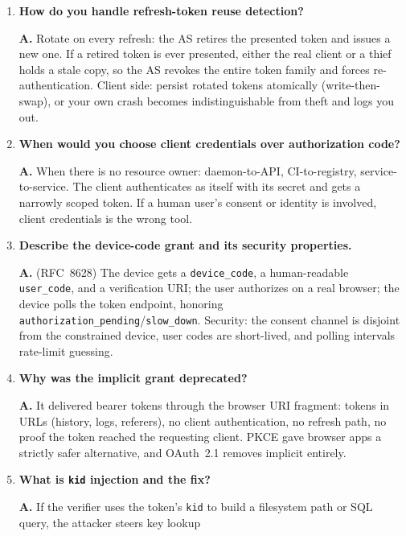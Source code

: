 \begin{enumerate}[label=\textbf{Q\arabic*.}, leftmargin=1.7cm, itemsep=0.9em, start=11]
        opaque, never parse it, never forward the ID token in its place.
        Audience enforcement is what makes the distinction meaningful.
  \item \textbf{How do you handle refresh-token reuse detection?}\par
        \textbf{A.} Rotate on every refresh: the AS retires the presented
        token and issues a new one. If a retired token is ever presented,
        either the real client or a thief holds a stale copy, so the AS
        revokes the entire token family and forces re-authentication. Client
        side: persist rotated tokens atomically (write-then-swap), or your
        own crash becomes indistinguishable from theft and logs you out.
  \item \textbf{When would you choose client credentials over authorization
        code?}\par
        \textbf{A.} When there is no resource owner: daemon-to-API,
        CI-to-registry, service-to-service. The client authenticates as
        itself with its secret and gets a narrowly scoped token. If a human
        user's consent or identity is involved, client credentials is the
        wrong tool.
  \item \textbf{Describe the device-code grant and its security
        properties.}\par
        \textbf{A.} (RFC~8628) The device gets a \texttt{device\_code}, a
        human-readable \texttt{user\_code}, and a verification URI; the user
        authorizes on a real browser; the device polls the token endpoint,
        honoring \texttt{authorization\_pending}/\texttt{slow\_down}.
        Security: the consent channel is disjoint from the constrained
        device, user codes are short-lived, and polling intervals rate-limit
        guessing.
  \item \textbf{Why was the implicit grant deprecated?}\par
        \textbf{A.} It delivered bearer tokens through the browser URI
        fragment: tokens in URLs (history, logs, referers), no client
        authentication, no refresh path, no proof the token reached the
        requesting client. PKCE gave browser apps a strictly safer
        alternative, and OAuth~2.1 removes implicit entirely.
  \item \textbf{What is \texttt{kid} injection and the fix?}\par
        \textbf{A.} If the verifier uses the token's \texttt{kid} to build a
        filesystem path or SQL query, the attacker steers key lookup

\end{enumerate}

